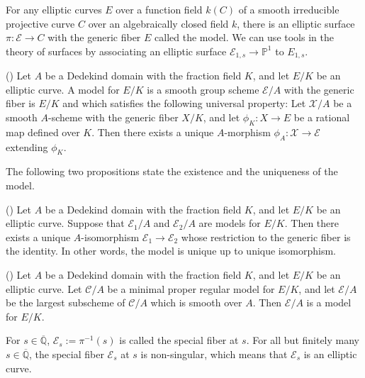 \documentclass[main]{subfiles}
\begin{document}
For any elliptic curves $E$ over a function field $k(C)$ of a smooth irreducible projective curve $C$ over an algebraically closed field $k$, there is an elliptic surface $\pi: \mathcal{E} \to C$ with the generic fiber $E$ called the \Neron{} model.
We can use tools in the theory of surfaces by associating an elliptic surface $\mathcal{E}_{1,s} \to \mathbb{P}^1$ to $E_{1,s}$.

\begin{dfn}{(\cite[IV\S 5 Definition]{ref:advancedaec})}
    Let $A$ be a Dedekind domain with the fraction field $K$, and let $E/K$ be an elliptic curve.
    A \Neron{} model for $E/K$ is a smooth group scheme $\mathcal{E}/A$ with the generic fiber is $E/K$ and which satisfies the following universal property:
    Let $\mathcal{X}/A$ be a smooth $A$-scheme with the generic fiber $X/K$, and let $\phi_K: X \to E$ be a rational map defined over $K$.
    Then there exists a unique $A$-morphism $\phi_A: \mathcal{X} \to \mathcal{E}$ extending $\phi_K$.
\end{dfn}

The following two propositions state the existence and the uniqueness of the \Neron{} model.
\begin{prop}{(\cite[Proposition IV.5.2. (a)]{ref:advancedaec})}
    Let $A$ be a Dedekind domain with the fraction field $K$, and let $E/K$ be an elliptic curve.
    Suppose that $\mathcal{E}_1/A$ and $\mathcal{E}_2/A$ are \Neron{} models for $E/K$.
    Then there exists a unique $A$-isomorphism $\mathcal{E}_1 \to \mathcal{E}_2$ whose restriction to the generic fiber is the identity.
    In other words, the \Neron{} model is unique up to unique isomorphism.
\end{prop}

\begin{prop}{(\cite[Theorem IV.6.1.]{ref:advancedaec})}
    Let $A$ be a Dedekind domain with the fraction field $K$, and let $E/K$ be an elliptic curve.
    Let $\mathcal{C}/A$ be a minimal proper regular model for $E/K$, and let $\mathcal{E}/A$ be the largest subscheme of $\mathcal{C}/A$ which is smooth over $A$.
    Then $\mathcal{E}/A$ is a \Neron{} model for $E/K$.
\end{prop}

For $s \in \overline{\mathbb{Q}}$, $\mathcal{E}_s:=\pi^{-1}(s)$ is called the special fiber at $s$.
For all but finitely many $s \in \overline{\mathbb{Q}}$, the special fiber $\mathcal{E}_s$ at $s$ is non-singular, which means that $\mathcal{E}_s$ is an elliptic curve.
\end{document}
